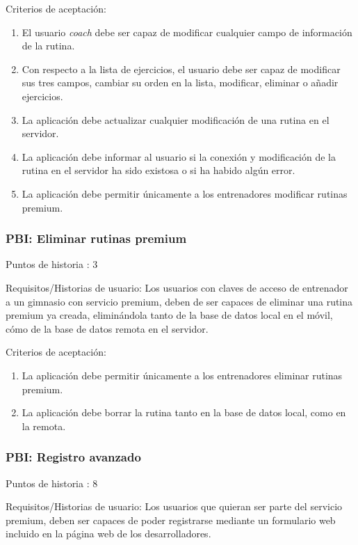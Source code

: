 \documentclass[11pt,a4paper]{report}
\begin{document}
Criterios de aceptación:
\begin{enumerate}
	\item El usuario \textit{coach }debe ser capaz de modificar cualquier campo de información de la rutina.
	
	\item Con respecto a la lista de ejercicios, el usuario debe ser capaz de modificar sus tres campos, cambiar su orden en la lista, modificar, eliminar o añadir ejercicios.
	
	\item La aplicación debe actualizar cualquier modificación de una rutina en el servidor.
	
	\item La aplicación debe informar al usuario si la conexión y modificación de la rutina en el servidor ha sido existosa o si ha habido algún error.
	
	\item La aplicación debe permitir únicamente a los entrenadores modificar rutinas premium.
	
\end{enumerate}
\subsubsection{PBI: Eliminar rutinas premium}
Puntos de historia : 3

Requisitos/Historias de usuario: Los usuarios con claves de acceso de entrenador a un gimnasio con servicio premium, deben de ser capaces de eliminar una rutina premium ya creada, eliminándola tanto de la base de datos local en el móvil, cómo de la base de datos remota en el servidor.

Criterios de aceptación:
\begin{enumerate}
	\item La aplicación debe permitir únicamente a los entrenadores eliminar rutinas premium.
	
	\item La aplicación debe borrar la rutina tanto en la base de datos local, como en la remota.
	
\end{enumerate}
\subsubsection{PBI: Registro avanzado}
Puntos de historia : 8

Requisitos/Historias de usuario: Los usuarios que quieran ser parte del servicio premium, deben ser capaces de poder registrarse mediante un formulario web incluido en la página web de los desarrolladores.
\end{document}
